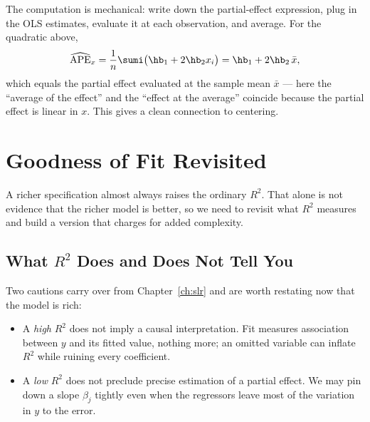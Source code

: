 The computation is mechanical: write down the partial-effect expression, plug in the OLS estimates, evaluate it at each observation, and average. For the quadratic above,
\[
\widehat{\text{APE}}_x = \frac{1}{n}\sumi \big(\hb_1 + 2\hb_2 x_i\big) = \hb_1 + 2\hb_2\,\bar x ,
\]
which equals the partial effect evaluated at the sample mean $\bar x$ --- here the ``average of the effect'' and the ``effect at the average'' coincide because the partial effect is linear in $x$. This gives a clean connection to centering.


\section{Goodness of Fit Revisited}

A richer specification almost always raises the ordinary $R^2$. That alone is not evidence that the richer model is better, so we need to revisit what $R^2$ measures and build a version that charges for added complexity.

\subsection{What \texorpdfstring{$R^2$}{R-squared} Does and Does Not Tell You}

Two cautions carry over from Chapter~\ref{ch:slr} and are worth restating now that the model is rich:
\begin{itemize}
    \item A \emph{high} $R^2$ does not imply a causal interpretation. Fit measures association between $y$ and its fitted value, nothing more; an omitted variable can inflate $R^2$ while ruining every coefficient.
    \item A \emph{low} $R^2$ does not preclude precise estimation of a partial effect. We may pin down a slope $\beta_j$ tightly even when the regressors leave most of the variation in $y$ to the error.
\end{itemize}

